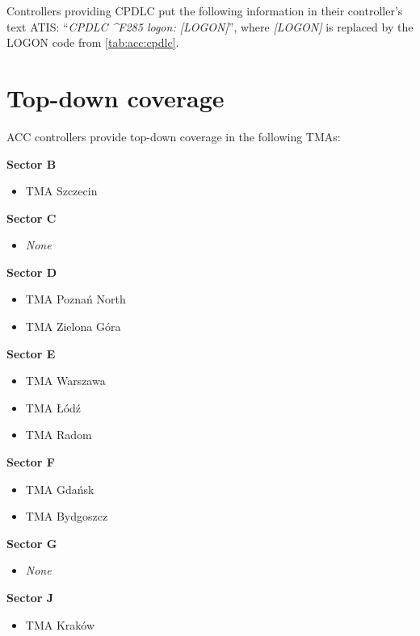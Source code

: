 Controllers providing CPDLC put the following information in their controller's
text ATIS: ``\textit{CPDLC \^{}F285 logon: [LOGON]}'', where \textit{[LOGON]} is
replaced by the LOGON code from \cref{tab:acc:cpdlc}.

\section{Top-down coverage}
\label{sec:acc:topdown}

ACC controllers provide top-down coverage in the following TMAs:
\begin{multicols}{2}
  \textbf{Sector B}
  \begin{itemize}
  \item TMA Szczecin
  \end{itemize}

  \textbf{Sector C}
  \begin{itemize}[label={}]
  \item \textit{None}
  \end{itemize}

  \textbf{Sector D}
  \begin{itemize}
  \item TMA Poznań North
  \item TMA Zielona Góra
  \end{itemize}

  \textbf{Sector E}
  \begin{itemize}
  \item TMA Warszawa
  \item TMA Łódź
  \item TMA Radom
  \end{itemize}

  \vfill\null\columnbreak

  \textbf{Sector F}
  \begin{itemize}
  \item TMA Gdańsk
  \item TMA Bydgoszcz
  \end{itemize}

  \textbf{Sector G}
  \begin{itemize}[label={}]
  \item \textit{None}
  \end{itemize}

  \textbf{Sector J}
  \begin{itemize}
  \item TMA Kraków
  \end{itemize}


\end{multicols}
